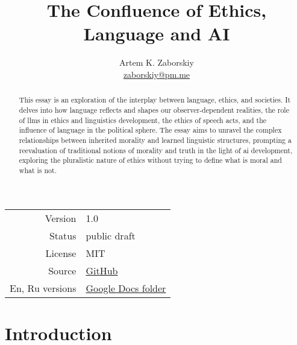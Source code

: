 \documentclass[11pt,a4]{article}
\begin{document}
\title{The Confluence of Ethics, Language and AI}

\author{Artem K. Zaborskiy\\ \href{mailto:zaborskiy@pm.me}{zaborskiy@pm.me}}

\maketitle



\begin{abstract}

This essay is an exploration of the interplay between language, ethics,
and societies. It delves into how language reflects and shapes our
observer-dependent realities, the role of \glspl{llm} in ethics and
linguistics development, the ethics of speech acts, and the influence
of language in the political sphere. The essay aims to unravel the
complex relationships between inherited morality and learned linguistic
structures, prompting a reevaluation of traditional notions of
morality and truth in the light of \gls{ai} development,
exploring the pluralistic nature of ethics without trying
to define what is moral and what is not.
\end{abstract}
\par
\begin{center}

\begin{tabular}{r|l}
    \hline
     Version & 1.0  \\
     Status & public draft  \\
     License & MIT  \\
     Source & \href{https://github.com/compartia/Zeitsinn/blob/master/language.tex}{GitHub} \\
     En, Ru versions & \href{https://drive.google.com/drive/folders/1hBFRGCIHgeUH0l3Xg6-QnEXOA5KdAitQ}{Google Docs folder} \\
     \hline
\end{tabular}
\end{center}

\par
\newpage

\tableofcontents


\printglossaries



%
\newpage
\section{Introduction}
\end{document}
